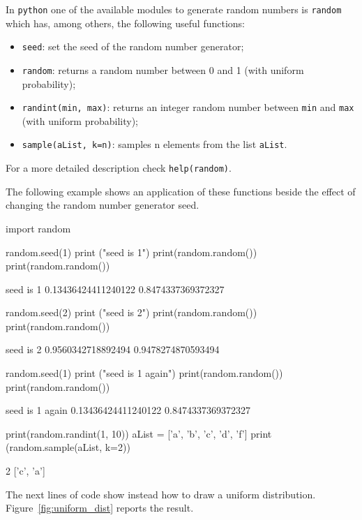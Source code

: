 In \texttt{python} one of the available modules to generate random numbers is \texttt{random} which has, among others, the following useful functions:
\begin{itemize}
\tightlist
\item
  \texttt{seed}: set the seed of the random number generator;
\item
  \texttt{random}: returns a random number between 0 and 1 (with uniform probability);
\item
  \texttt{randint(min,\ max)}: returns an integer random number between \texttt{min} and \texttt{max} (with uniform probability);
\item
  \texttt{sample(aList,\ k=n)}: samples n elements from the list
  \texttt{aList}.
\end{itemize}
\noindent
For a more detailed description check \texttt{help(random)}.

The following example shows an application of these functions beside the effect of changing the random number generator seed.

\begin{ipython}
import random

random.seed(1)
print ("seed is 1")
print(random.random())
print(random.random())
\end{ipython}
\begin{ioutput}
seed is 1
0.13436424411240122
0.8474337369372327
\end{ioutput}
\begin{ipython}
random.seed(2)
print ("seed is 2")
print(random.random())
print(random.random())
\end{ipython}
\begin{ioutput}
seed is 2
0.9560342718892494
0.9478274870593494
\end{ioutput}
\begin{ipython}
random.seed(1)
print ("seed is 1 again")
print(random.random())
print(random.random())
\end{ipython}
\begin{ioutput}
seed is 1 again
0.13436424411240122
0.8474337369372327
\end{ioutput}
\begin{ipython}
print(random.randint(1, 10))
aList = ['a', 'b', 'c', 'd', 'f']
print (random.sample(aList, k=2))
\end{ipython}
\begin{ioutput}
2
['c', 'a']
\end{ioutput}

The next lines of code show instead how to draw a uniform distribution. Figure~\ref{fig:uniform_dist} reports the result.

